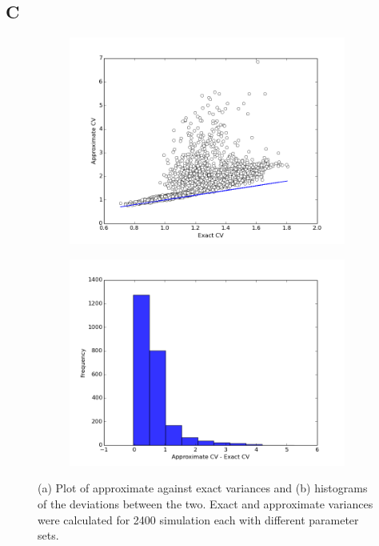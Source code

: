 \documentclass[a4paper,12pt]{article}
\begin{document}
\subsection*{C}

\begin{figure}[!ht]
        \centering
        \begin{subfigure}[!ht]{0.7\textwidth}
                \includegraphics[width=\textwidth]{images/approx_exact_var}
                \caption{}
                \label{fig:approx_exact_var}
        \end{subfigure}%
        
        \begin{subfigure}[b]{0.7\textwidth}
                \includegraphics[width=\textwidth]{images/approx_var_dev}
                \caption{}
                \label{fig:approx_var_dev}
        \end{subfigure}
        
\caption{(a) Plot of approximate against exact variances and (b) histograms of the deviations between the two. Exact and approximate variances were calculated for 2400 simulation each with different parameter sets.}
\label{fig:dev_hists}
\end{figure}
\end{document}
